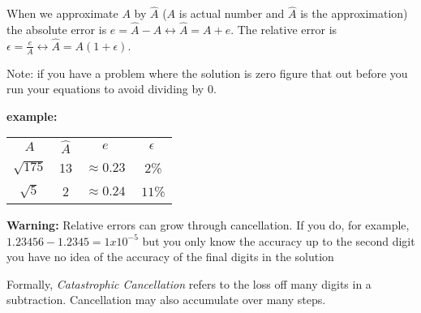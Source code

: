 \documentclass{article}
\newcommand{\n}{\newline}
\begin{document}
	\begin{flushleft}
	When we approximate $A$ by $\hat{A}$ ($A$ is actual number and $\hat{A}$ is the approximation) the absolute error is $e=\hat{A}-A\leftrightarrow \hat{A}=A+e$.  The relative error is $\epsilon=\frac{e}{A}\leftrightarrow\hat{A}=A(1+\epsilon)$.  \n
	
	Note: if you have a problem where the solution is zero figure that out before you run your equations to avoid dividing by 0. \n
	
	\textbf{example:}
	\end{flushleft}
	\begin{tabular}{c c c c}
		$A$ & $\hat{A}$ & $e$ & $\epsilon$ \\
		$\sqrt{175}$ & 13 & $\approx0.23$ & $~2$\% \\
		$\sqrt{5}$ & 2 & $\approx0.24$ &  $~11$\%
	\end{tabular}
	\begin{flushleft}
		
	\textbf{Warning:} Relative errors can grow through cancellation.  If you do, for example, $1.23456-1.2345=1x10^{-5}$ but you only know the accuracy up to the second digit you have no idea of the accuracy of the final digits in the solution\n
	
	Formally, \textit{Catastrophic Cancellation} refers to the loss off many digits in a subtraction.  Cancellation may also accumulate over many steps.
	\end{flushleft}
\end{document}
